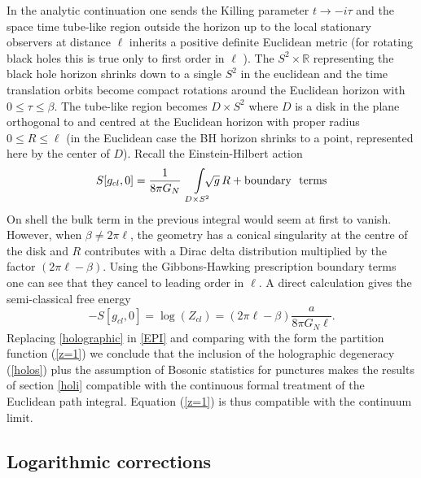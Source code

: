 \documentclass[aps, nofootinbib,superscriptaddress,12pt]{revtex4-2}
\def\be{\begin{equation}}
\def\ee{\end{equation}}
\newcommand{\R}{\mathbb{R}}
\begin{document}
In the analytic continuation one sends the Killing parameter $t\to -i\tau$ and the space time tube-like region outside the horizon up to the local stationary observers at distance $\ell$ inherits a positive definite Euclidean metric (for rotating black holes this is true only to first order in $\ell$ \cite{Frodden:thesis}). The $S^2\times \R$ representing the black hole horizon shrinks down to a single $S^2$ in the euclidean and the time translation orbits become compact rotations around the Euclidean horizon with $0\le \tau\le \beta$.  The tube-like region becomes $D\times S^2$ where $D$ is a disk in the plane orthogonal to and centred at the Euclidean horizon with proper radius $0\le R\le \ell$ (in the Euclidean case the BH horizon shrinks to a point, represented here by the center of $D$). Recall the Einstein-Hilbert action
\be
S[g_{cl}, 0]=\frac{1}{8\pi G_{N}} \ \int\limits_{D\times S^2} \!\!\!\!\!\sqrt{g} \, R +{\rm boundary\ \ terms}
\ee
On shell the bulk term in the previous integral would seem at first to vanish. However, when $\beta\not=2\pi \ell$, the geometry has a conical singularity at the centre of the disk and $R$ contributes with a Dirac delta distribution multiplied by the factor $(2\pi \ell-\beta)$. Using the Gibbons-Hawking prescription  boundary terms \cite{Gibbons:1976ue,York:1986it} one can see that they cancel to leading order in $\ell$.
A direct calculation gives the semi-classical free energy
\be\label{holographic}
-S[g_{cl}, 0]=\log(Z_{cl})=(2\pi \ell-\beta) \frac{a}{8\pi G_{N} \ell}.
\ee
Replacing \eqref{holographic} in \eqref{EPI} and comparing with the form the partition function (\ref{z=1}) we conclude 
that  the inclusion of the holographic degeneracy (\ref{holos}) plus the assumption of 
Bosonic statistics for punctures makes the results of section \ref{holi} compatible with the continuous 
formal treatment of the Euclidean path integral. Equation (\ref{z=1}) is thus  compatible with the continuum limit.



\subsection{Logarithmic corrections}
\end{document}
